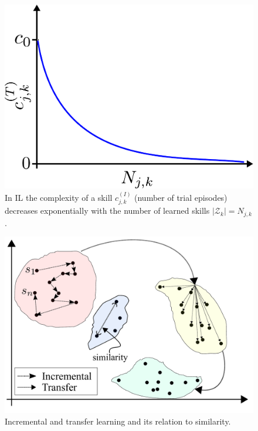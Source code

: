 \begin{figure}[!ht]
	\centering
	\includegraphics[width=0.8\columnwidth]{tex/fig/complexity_incremental.pdf}
	\caption{In IL the complexity of a skill $c^{(I)}_{j,k}$ (number of trial episodes) decreases exponentially with the number of learned skills $|\mathcal{Z}_k|=N_{j,k}$.}
	\label{fig:complexity_per_cardinality}
\end{figure}
\begin{figure}[!t]
	\centering
	\includegraphics[width=0.9\columnwidth]{fig/incremental_transfer_similarity_v2.pdf}
	\caption{Incremental and transfer learning and its relation to similarity.}
	\label{fig:incremental_transfer_similarity}
\end{figure}
